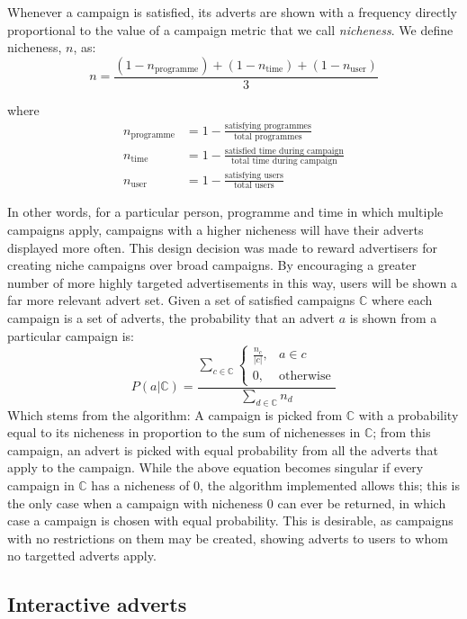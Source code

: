 	Whenever a campaign is satisfied, its adverts are shown with a frequency directly proportional to the value of a campaign metric that we call \textit{nicheness}. We define nicheness, $n$, as:
	$$
		n = \frac{(1-n_\text{programme}) + (1-n_\text{time}) + (1-n_\text{user})}{3}
	$$

	where
	\begin{align*}
		n_\text{programme} &= 1 - \frac{\text{satisfying programmes}}{\text{total programmes}} \\
		n_\text{time} &= 1 - \frac{\text{satisfied time during campaign}}{\text{total time during campaign}} \\
		n_\text{user} &= 1 - \frac{\text{satisfying users}}{\text{total users}}
	\end{align*}

	In other words, for a particular person, programme and time in which multiple campaigns apply, campaigns with a higher nicheness will have their adverts displayed more often. This design decision was made to reward advertisers for creating niche campaigns over broad campaigns. By encouraging a greater number of more highly targeted advertisements in this way, users will be shown a far more relevant advert set. Given a set of satisfied campaigns $\mathbb{C}$ where each campaign is a set of adverts, the probability that an advert $a$ is shown from a particular campaign is:
	$$
		P(a|\mathbb{C}) =
		\frac{
			\displaystyle \sum_{c \in \mathbb{C}}
			\begin{cases}
				\frac{n_c}{\left|c\right|}, & a \in c \\
				0, & \text{otherwise}
			\end{cases}
		}{
			\displaystyle \sum_{d \in \mathbb{C}} n_d
		}
	$$
Which stems from the algorithm: A campaign is picked from $\mathbb{C}$ with a probability equal to its nicheness in proportion to the sum of nichenesses in $\mathbb{C}$; from this campaign, an advert is picked with equal probability from all the adverts that apply to the campaign. While the above equation becomes singular if every campaign in $\mathbb{C}$ has a nicheness of 0, the algorithm implemented allows this; this is the only case when a campaign with nicheness 0 can ever be returned, in which case a campaign is chosen with equal probability. This is desirable, as campaigns with no restrictions on them may be created, showing adverts to users to whom no targetted adverts apply.

\subsection{Interactive adverts}

